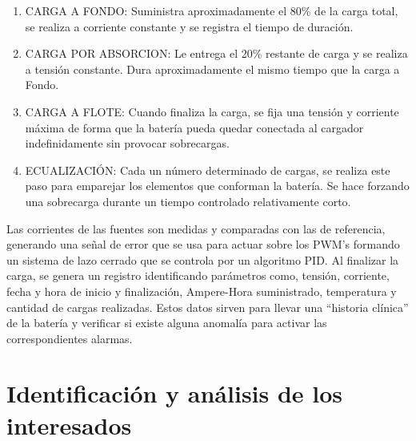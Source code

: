 \documentclass[11pt]{charter}
\begin{document}

\begin{enumerate}
\item CARGA A FONDO: Suministra aproximadamente el 80\% de la carga total, se realiza a corriente constante y se registra el tiempo de duración.
\item CARGA POR ABSORCION: Le entrega el 20\% restante de carga y se realiza a tensión constante. Dura aproximadamente el mismo tiempo que la carga a Fondo.
\item CARGA A FLOTE: Cuando finaliza la carga, se fija una tensión y corriente máxima de forma que la batería pueda quedar conectada al cargador indefinidamente sin provocar sobrecargas.
\item ECUALIZACIÓN: Cada un número determinado de cargas, se realiza este paso para emparejar los elementos que conforman la batería. Se hace forzando una sobrecarga durante un tiempo controlado relativamente corto.
\end{enumerate}

Las corrientes de las fuentes son medidas y comparadas con las de referencia, generando una señal de error que se usa para actuar sobre los PWM’s formando un sistema de lazo cerrado que se controla por un algoritmo PID.
Al finalizar la carga, se genera un registro identificando parámetros como, tensión, corriente, fecha y hora de inicio y finalización, Ampere-Hora suministrado, temperatura y cantidad de cargas realizadas. Estos datos sirven para llevar una “historia clínica” de la batería y verificar si existe alguna anomalía para activar las correspondientes alarmas.


\section{Identificación y análisis de los interesados}
\label{sec:interesados}
\end{document}
